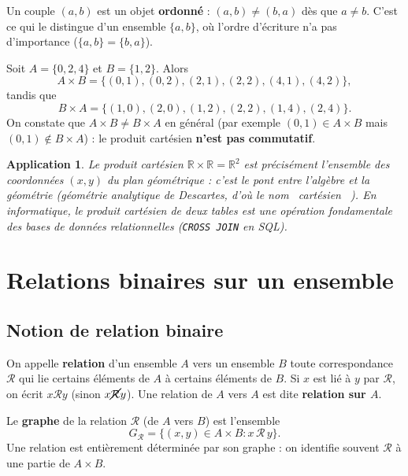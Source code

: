 \documentclass[a4paper,12pt,openany]{book}
\providecommand{\og}{\guillemotleft~}
\providecommand{\fg}{\ifhmode~\fi\guillemotright}
\newtheorem{application}{Application}[section]
\begin{document}
\begin{remarque}
Un couple $(a,b)$ est un objet \textbf{ordonné} : $(a,b) \neq (b,a)$ dès que
$a \neq b$. C'est ce qui le distingue d'un ensemble $\{a,b\}$, où l'ordre
d'écriture n'a pas d'importance ($\{a,b\}=\{b,a\}$).
\end{remarque}

\begin{exemple}
Soit $A=\{0,2,4\}$ et $B=\{1,2\}$. Alors
\[
A \times B = \big\{(0,1),(0,2),(2,1),(2,2),(4,1),(4,2)\big\},
\]
tandis que
\[
B \times A = \big\{(1,0),(2,0),(1,2),(2,2),(1,4),(2,4)\big\}.
\]
On constate que $A \times B \neq B \times A$ en général (par exemple
$(0,1) \in A\times B$ mais $(0,1) \notin B\times A$) : le produit cartésien
\textbf{n'est pas commutatif}.
\end{exemple}


\begin{application}
Le produit cartésien $\mathbb{R} \times \mathbb{R} = \mathbb{R}^2$ est
précisément l'ensemble des coordonnées $(x,y)$ du plan géométrique : c'est le
pont entre l'algèbre et la géométrie (géométrie analytique de Descartes, d'où
le nom \og cartésien \fg). En informatique, le produit cartésien de deux
tables est une opération fondamentale des bases de données relationnelles
(\texttt{CROSS JOIN} en SQL).
\end{application}

\section{Relations binaires sur un ensemble}

\subsection{Notion de relation binaire}


\begin{definition}
On appelle \textbf{relation} d'un ensemble $A$ vers un ensemble $B$ toute
correspondance $\mathcal{R}$ qui lie certains éléments de $A$ à certains
éléments de $B$. Si $x$ est lié à $y$ par $\mathcal{R}$, on écrit
$x\mathcal{R}y$ (sinon $x\cancel{\mathcal{R}}y$). Une relation de $A$ vers
$A$ est dite \textbf{relation sur $A$}.
\end{definition}

\begin{definition}
Le \textbf{graphe} de la relation $\mathcal{R}$ (de $A$ vers $B$) est
l'ensemble
\[
G_{\mathcal{R}} = \{(x,y) \in A\times B : x\,\mathcal{R}\,y\}.
\]
Une relation est entièrement déterminée par son graphe : on identifie souvent
$\mathcal{R}$ à une partie de $A \times B$.
\end{definition}
\end{document}
